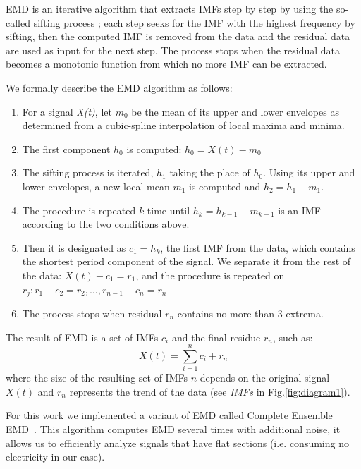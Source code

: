 EMD is an iterative algorithm that extracts IMFs step by step by using the so-called sifting process \cite{huang:emd1998}; each step seeks for the IMF with the highest frequency by sifting, then the computed IMF is removed from the data and the residual data are used as input for the 
next step.
The process stops when the residual data becomes a monotonic function from which no more IMF can be extracted.

We formally describe the EMD algorithm as follows: 
\begin{enumerate}
\item For a signal \emph{X(t)}, let $m_0$ be the mean of its upper and lower envelopes as determined from a cubic-spline interpolation of local maxima and minima.
\item The first component $h_0$ is computed: $h_0=X(t)-m_0$
\item The sifting process is iterated, $h_1$ taking the place of $h_0$. Using its upper and lower envelopes, a new local mean $m_1$ is computed and $h_2 = h_1-m_1$.
\item The procedure is repeated $k$ time until $h_k=h_{k-1}-m_{k-1}$ is an IMF according to the two conditions above.
\item Then it is designated as $c_1=h_{k}$, the first IMF from the data, which contains the shortest period component of the signal. We separate it from the rest of the data: $X(t)-c_1 = r_1$, and the procedure is
repeated on $r_j: r_1-c_2 = r_2,\dots,r_{n-1} - c_n = r_n$
\item The process stops when residual $r_n$ contains no more than 3 extrema.
\end{enumerate}

The result of EMD is a set of IMFs $c_i$ and the final residue $r_n$, such as: \[X(t)=\sum^{n}_{i=1}c_i+r_n\]
where the size of the resulting set of IMFs $n$ depends on the original signal $X(t)$ and $r_n$ represents the trend of 
the data (see \emph{IMFs} in Fig.\ref{fig:diagram1}).

For this work we implemented a variant of EMD called Complete Ensemble EMD~\cite{torres:icassp2012}.
This algorithm computes EMD several times with additional noise, it allows us to efficiently analyze signals that have 
flat sections (i.e. consuming no electricity in our case). %

